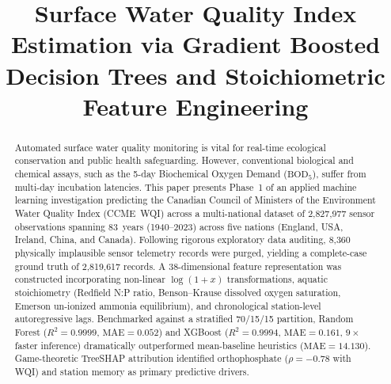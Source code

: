 \documentclass[conference]{IEEEtran}
\begin{document}

\title{Surface Water Quality Index Estimation via Gradient Boosted
       Decision Trees and Stoichiometric Feature Engineering}

\author{
}

\maketitle

\begin{abstract}
Automated surface water quality monitoring is vital for real-time
ecological conservation and public health safeguarding. However,
conventional biological and chemical assays, such as the 5-day
Biochemical Oxygen Demand ($\text{BOD}_5$), suffer from multi-day
incubation latencies. This paper presents Phase~1 of an applied
machine learning investigation predicting the Canadian Council of
Ministers of the Environment Water Quality Index (CCME~WQI) across a
multi-national dataset of 2,827,977 sensor observations spanning
83~years (1940--2023) across five nations (England, USA, Ireland,
China, and Canada). Following rigorous exploratory data auditing,
8,360 physically implausible sensor telemetry records were purged,
yielding a complete-case ground truth of 2,819,617 records. A
38-dimensional feature representation was constructed incorporating
non-linear $\log(1+x)$ transformations, aquatic stoichiometry (Redfield
N:P ratio, Benson--Krause dissolved oxygen saturation, Emerson
un-ionized ammonia equilibrium), and chronological station-level
autoregressive lags. Benchmarked against a stratified 70/15/15
partition, Random Forest ($R^2{=}0.9999$, $\text{MAE}{=}0.052$) and
XGBoost ($R^2{=}0.9994$, $\text{MAE}{=}0.161$, $9{\times}$ faster
inference) dramatically outperformed mean-baseline heuristics
($\text{MAE}{=}14.130$). Game-theoretic TreeSHAP attribution identified
orthophosphate ($\rho{=}{-0.78}$ with WQI) and station memory as
primary predictive drivers.
\end{abstract}
\end{document}
